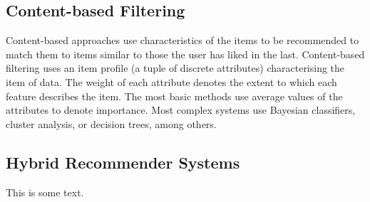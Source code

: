 \subsection{Content-based Filtering}

Content-based approaches use characteristics of the items to be recommended to match them to items similar to those the user has liked in the last. Content-based filtering uses an item profile (a tuple of discrete attributes) characterising the item of data. The weight of each attribute denotes the extent to which each feature describes the item. The most basic methods use average values of the attributes to denote importance. Most complex systems use Bayesian classifiers, cluster analysis, or decision trees, among others.

\subsection{Hybrid Recommender Systems}

This is some text.






